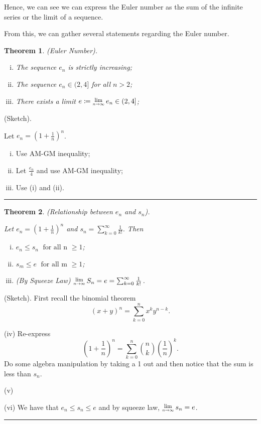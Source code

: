 \documentclass[twoside]{article}
\newcounter{lecnum}
\newcommand{\Lim}[1]{\raisebox{0.5ex}{\scalebox{0.8}{$\displaystyle \lim_{#1}\;$}}}
\newtheorem{theorem}{Theorem}[lecnum]
\newenvironment{proof}{{\bf Proof:}}{\hfill\rule{2mm}{2mm}}
\begin{document}
Hence, we can see we can express the Euler number as the sum of the infinite series or the limit of a sequence.

From this, we can gather several statements regarding the Euler number.

\begin{theorem}
(Euler Number).
\begin{enumerate}[(i)]
    \item The sequence $e_n$ is strictly increasing;
    \item The sequence $e_n \in (2,4]$ for all $n > 2$;
    \item There exists a limit $e \coloneqq \Lim{n \rightarrow \infty} e_n \in (2,4]$;
\end{enumerate}
\end{theorem}

\begin{proof} (Sketch).

Let $e_n = (1 + \frac{1}{n})^n$.
\begin{enumerate}[(i)]
  \item Use AM-GM inequality;
  \item Let $\frac{e_n}{4}$ and use AM-GM inequality;
  \item Use (i) and (ii).
\end{enumerate}
\end{proof}

\begin{theorem}
(Relationship between $e_n$ and $s_n$).

Let $e_n = (1 + \frac{1}{n})^n$ and $s_n = \sum_{k=0}^{\infty}\frac{1}{k!}$. Then 
\begin{enumerate}[(i)]
    \item $e_n \leq s_n \; \text{ for all n } \geq 1$;
    \item $s_m \leq e \; \text{ for all m } \geq 1$;
    \item (By Squeeze Law) $\Lim{n \rightarrow \infty}S_n = e = \sum_{k=0}^{\infty}\frac{1}{k!}$.
\end{enumerate}
\end{theorem}

\begin{proof}
(Sketch). First recall the binomial theorem
$$
(x + y)^n = \sum_{k=0}^nx^ky^{n-k}.
$$

(iv)
Re-express
$$
(1 + \frac{1}{n})^n = \sum_{k=0}^n {n\choose k}(\frac{1}{n})^k.
$$
Do some algebra manipulation by taking a 1 out and then notice that the sum is less than $s_n$.

\bigskip

(v)

\bigskip
(vi)
We have that $e_n \leq s_n \leq e$ and by squeeze law, $\Lim{n \rightarrow \infty}s_n = e$.
\end{proof}
\end{document}
